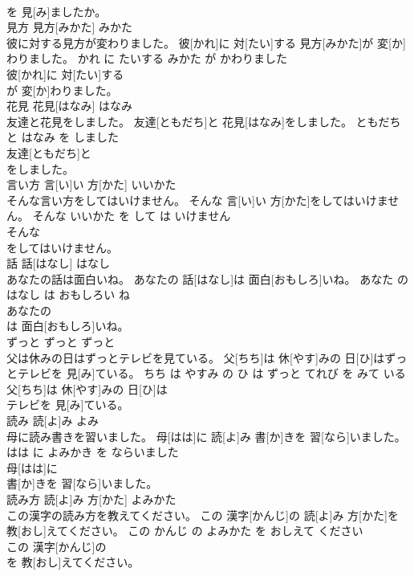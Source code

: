 \documentclass[8pt]{extreport}
\begin{document}
\begin{CJK}{UTF8}{min}
\\	を 見[み]ましたか。		
\\	見方	見方[みかた]	みかた	
\\	彼に対する見方が変わりました。	彼[かれ]に 対[たい]する 見方[みかた]が 変[か]わりました。	かれ に たいする みかた が かわりました	
\\	彼[かれ]に 対[たい]する
\\	が 変[か]わりました。		
\\	花見	花見[はなみ]	はなみ	
\\	友達と花見をしました。	友達[ともだち]と 花見[はなみ]をしました。	ともだち と はなみ を しました	
\\	友達[ともだち]と
\\	をしました。		
\\	言い方	言[い]い 方[かた]	いいかた	
\\	そんな言い方をしてはいけません。	そんな 言[い]い 方[かた]をしてはいけません。	そんな いいかた を して は いけません	
\\	そんな
\\	をしてはいけません。		
\\	話	話[はなし]	はなし	
\\	あなたの話は面白いね。	あなたの 話[はなし]は 面白[おもしろ]いね。	あなた の はなし は おもしろい ね	
\\	あなたの
\\	は 面白[おもしろ]いね。		
\\	ずっと	ずっと	ずっと	
\\	父は休みの日はずっとテレビを見ている。	父[ちち]は 休[やす]みの 日[ひ]はずっとテレビを 見[み]ている。	ちち は やすみ の ひ は ずっと てれび を みて いる	
\\	父[ちち]は 休[やす]みの 日[ひ]は
\\	テレビを 見[み]ている。		
\\	読み	読[よ]み	よみ	
\\	母に読み書きを習いました。	母[はは]に 読[よ]み 書[か]きを 習[なら]いました。	はは に よみかき を ならいました	
\\	母[はは]に
\\	書[か]きを 習[なら]いました。		
\\	読み方	読[よ]み 方[かた]	よみかた	
\\	この漢字の読み方を教えてください。	この 漢字[かんじ]の 読[よ]み 方[かた]を 教[おし]えてください。	この かんじ の よみかた を おしえて ください	
\\	この 漢字[かんじ]の
\\	を 教[おし]えてください。		

\end{CJK}
\end{document}
